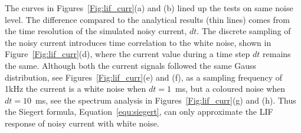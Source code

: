 	The curves in Figures~\ref{Fig:lif_curr}(a) and (b) lined up the tests on same noise level.
	The difference compared to the analytical results (thin lines) comes from the time resolution of the simulated noisy current, $dt$.
	The discrete sampling of the noisy current introduces time correlation to the white noise, shown in  Figure~\ref{Fig:lif_curr}(d), where the current value during a time step $dt$ remains the same.
	Although both the current signals followed the same Gauss distribution, see Figures~\ref{Fig:lif_curr}(e) and (f), as a sampling frequency of 1kHz the current is a white noise when $dt=1$~ms, but a coloured noise when $dt=10$~ms, see the spectrum analysis in Figures~\ref{Fig:lif_curr}(g) and (h).
	Thus the Siegert formula, Equation~\ref{equ:siegert}, can only approximate the LIF response of noisy current with white noise.
	
